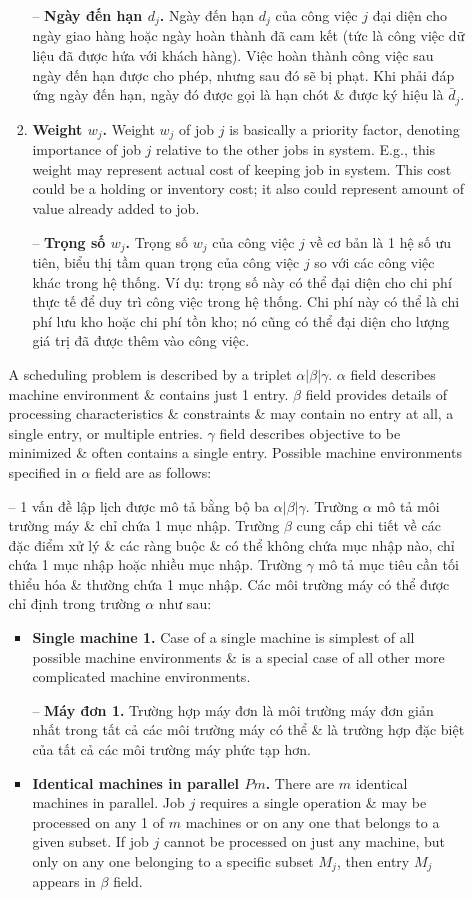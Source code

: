 \documentclass{article}
\begin{document}
\begin{itemize}
\begin{itemize}
\begin{enumerate}
            -- {\bf Ngày đến hạn $d_j$.} Ngày đến hạn $d_j$ của công việc $j$ đại diện cho ngày giao hàng hoặc ngày hoàn thành đã cam kết (tức là công việc dữ liệu đã được hứa với khách hàng). Việc hoàn thành công việc sau ngày đến hạn được cho phép, nhưng sau đó sẽ bị phạt. Khi phải đáp ứng ngày đến hạn, ngày đó được gọi là hạn chót \& được ký hiệu là $\bar{d}_j$.
            \item {\bf Weight $w_j$.} Weight $w_j$ of job $j$ is basically a priority factor, denoting importance of job $j$ relative to the other jobs in system. E.g., this weight may represent actual cost of keeping job in system. This cost could be a holding or inventory cost; it also could represent amount of value already added to job.

            -- {\bf Trọng số $w_j$.} Trọng số $w_j$ của công việc $j$ về cơ bản là 1 hệ số ưu tiên, biểu thị tầm quan trọng của công việc $j$ so với các công việc khác trong hệ thống. Ví dụ: trọng số này có thể đại diện cho chi phí thực tế để duy trì công việc trong hệ thống. Chi phí này có thể là chi phí lưu kho hoặc chi phí tồn kho; nó cũng có thể đại diện cho lượng giá trị đã được thêm vào công việc.
        \end{enumerate}
        A scheduling problem is described by a triplet $\alpha|\beta|\gamma$. $\alpha$ field describes machine environment \& contains just 1 entry. $\beta$ field provides details of processing characteristics \& constraints \& may contain no entry at all, a single entry, or multiple entries. $\gamma$ field describes objective to be minimized \& often contains a single entry. Possible machine environments specified in $\alpha$ field are as follows:

        -- 1 vấn đề lập lịch được mô tả bằng bộ ba $\alpha|\beta|\gamma$. Trường $\alpha$ mô tả môi trường máy \& chỉ chứa 1 mục nhập. Trường $\beta$ cung cấp chi tiết về các đặc điểm xử lý \& các ràng buộc \& có thể không chứa mục nhập nào, chỉ chứa 1 mục nhập hoặc nhiều mục nhập. Trường $\gamma$ mô tả mục tiêu cần tối thiểu hóa \& thường chứa 1 mục nhập. Các môi trường máy có thể được chỉ định trong trường $\alpha$ như sau:
        \begin{itemize}
            \item {\bf Single machine 1.} Case of a single machine is simplest of all possible machine environments \& is a special case of all other more complicated machine environments.

            -- {\bf Máy đơn 1.} Trường hợp máy đơn là môi trường máy đơn giản nhất trong tất cả các môi trường máy có thể \& là trường hợp đặc biệt của tất cả các môi trường máy phức tạp hơn.
            \item {\bf Identical machines in parallel $Pm$.} There are $m$ identical machines in parallel. Job $j$ requires a single operation \& may be processed on any 1 of $m$ machines or on any one that belongs to a given subset. If job $j$ cannot be processed on just any machine, but only on any one belonging to a specific subset $M_j$, then entry $M_j$ appears in $\beta$ field.


\end{itemize}
\end{itemize}
\end{itemize}
\end{document}
